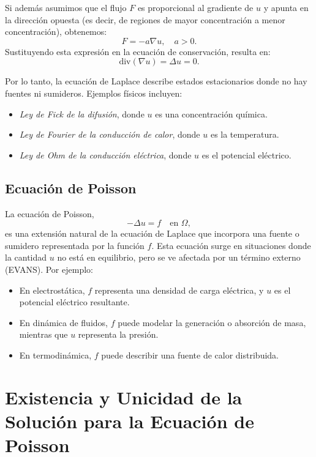 Si además asumimos que el flujo $F$ es proporcional al gradiente de $u$ y apunta en la dirección opuesta (es decir, de regiones de mayor concentración a menor concentración), obtenemos:
\begin{equation*}
    F = -a \nabla u, \quad a > 0.
\end{equation*}
Sustituyendo esta expresión en la ecuación de conservación, resulta en:
\begin{equation*}
    \text{div}(\nabla u) = \Delta u = 0.
\end{equation*}

Por lo tanto, la ecuación de Laplace describe estados estacionarios donde no hay fuentes ni sumideros. Ejemplos físicos incluyen:
\begin{itemize}
    \item \textit{Ley de Fick de la difusión}, donde $u$ es una concentración química.
    \item \textit{Ley de Fourier de la conducción de calor}, donde $u$ es la temperatura.
    \item \textit{Ley de Ohm de la conducción eléctrica}, donde $u$ es el potencial eléctrico.
\end{itemize}

\subsection{Ecuación de Poisson}

La ecuación de Poisson,
\begin{equation*}
    -\Delta u = f \quad \text{en } \Omega,
\end{equation*}
es una extensión natural de la ecuación de Laplace que incorpora una fuente o sumidero representada por la función $f$. Esta ecuación surge en situaciones donde la cantidad $u$ no está en equilibrio, pero se ve afectada por un término externo (EVANS). Por ejemplo:
\begin{itemize}
    \item En electrostática, $f$ representa una densidad de carga eléctrica, y $u$ es el potencial eléctrico resultante.
    \item En dinámica de fluidos, $f$ puede modelar la generación o absorción de masa, mientras que $u$ representa la presión.
    \item En termodinámica, $f$ puede describir una fuente de calor distribuida.
\end{itemize}

\section{Existencia y Unicidad de la Solución para la Ecuación de Poisson}

